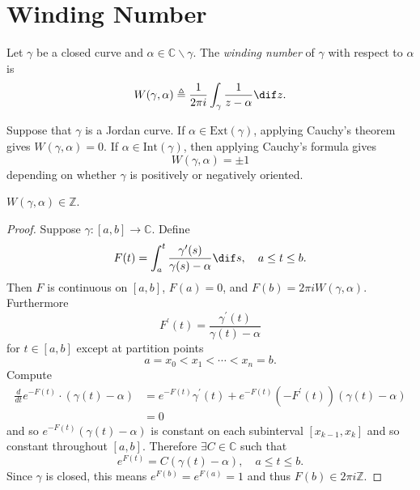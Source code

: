 \section{Winding Number}

\begin{defn}
Let $\gamma$ be a closed curve and
$\alpha \in \mathbb{C} \backslash \gamma$. The \emph{winding number}
of $\gamma$ with respect to $\alpha$ is
$$
           W(\gamma, \alpha)
\triangleq \frac{1}{2 \pi i}
           \int_\gamma
             \frac{1}{z - \alpha}
             \dif z.
$$
\end{defn}

\begin{xmpl}
Suppose that $\gamma$ is a Jordan curve. If $\alpha \in \mathrm{Ext}(\gamma)$,
applying Cauchy's theorem gives $W(\gamma, \alpha) = 0$. If
$\alpha \in \mathrm{Int}(\gamma)$, then applying Cauchy's formula gives
$$
W(\gamma, \alpha) = \pm 1
$$
depending on whether $\gamma$ is positively or negatively oriented.
\end{xmpl}

\begin{lemma}
$W(\gamma, \alpha) \in \mathbb{Z}$.
\end{lemma}

\begin{proof}
Suppose $\gamma : [a, b] \to \mathbb{C}$. Define
$$
  F(t)
= \int_a^t
    \frac{\gamma^\prime(s)}{\gamma(s) - \alpha}
    \dif s, \quad
a \leq t \leq b.
$$
Then $F$ is continuous on $[a, b]$, $F(a) = 0$, and
$F(b) = 2 \pi i W(\gamma, \alpha)$. Furthermore
$$
F^\prime(t) = \frac{\gamma^\prime(t)}{\gamma(t) - \alpha}
$$
for $t \in [a, b]$ except at partition points
$$
a = x_0 < x_1 < \cdots < x_n = b.
$$
Compute
\begin{align*}
   \frac{d}{dt}
     e^{-F(t)} \cdot (\gamma(t) - \alpha)
&= e^{-F(t)} \gamma^\prime(t)
 + e^{-F(t)} (-F^\prime(t))(\gamma(t) - \alpha) \\
&= 0
\end{align*}
and so $e^{-F(t)} (\gamma(t) - \alpha)$ is constant on
each subinterval $[x_{k-1}, x_k]$ and so constant throughout
$[a,b]$. Therefore $\exists C \in \mathbb{C}$ such that
$$
e^{F(t)} = C(\gamma(t) - \alpha), \quad a \leq t \leq b.
$$
Since $\gamma$ is closed, this means $e^{F(b)} = e^{F(a)} = 1$ and
thus $F(b) \in 2 \pi i \mathbb{Z}$.
\end{proof}

